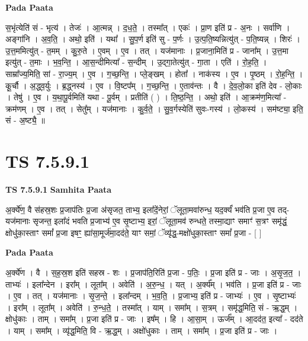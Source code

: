 \documentclass[17pt]{extarticle}
\begin{document}
\textbf{Pada Paata} \newline

स॒भृंत्येति॑ सं - भृत्य॑ । तेजः॑ । आ॒त्मन्न् । द॒ध॒ते॒ । तस्मा᳚त् । एकः॑ । प्रा॒ण इति॑ प्र - अ॒नः । सर्वा॑णि । अङ्गा॑नि । अ॒व॒ति॒ । अथो॒ इति॑ । यथा᳚ । सु॒प॒र्ण इति॑ सु - प॒र्णः । उ॒त्प॒ति॒ष्यन्नित्यु॑त् - प॒ति॒ष्यन्न् । शिरः॑ । उ॒त्त॒ममित्यु॑त् - त॒मम् । कु॒रु॒ते । ए॒वम् । ए॒व । तत् । यज॑मानाः । प्र॒जाना॒मिति॑ प्र - जाना᳚म् । उ॒त्त॒मा इत्यु॑त् - त॒माः । भ॒व॒न्ति॒ । आ॒स॒न्दीमित्या᳚ - स॒न्दीम् । उ॒द्गा॒तेत्यु॑त् - गा॒ता । एति॑ । रो॒ह॒ति॒ । साम्रा᳚ज्य॒मिति॒ सां - रा॒ज्य॒म् । ए॒व । ग॒च्छ॒न्ति॒ । प्ले॒ङ्खम् । होता᳚ । नाक॑स्य । ए॒व । पृ॒ष्ठम् । रो॒ह॒न्ति॒ । कू॒र्चौ । अ॒द्ध्व॒र्युः । ब्र॒द्ध्नस्य॑ । ए॒व । वि॒ष्टप᳚म् । ग॒च्छ॒न्ति॒ । ए॒ताव॑न्तः । वै । दे॒व॒लो॒का इति॑ देव - लो॒काः । तेषु॑ । ए॒व । य॒था॒पू॒र्वमिति॑ यथा - पू॒र्वम् । प्रतीति॑ ( ) । ति॒ष्ठ॒न्ति॒ । अथो॒ इति॑ । आ॒क्रम॑ण॒मित्या᳚ - क्रम॑णम् । ए॒व । तत् । सेतु᳚म् । यज॑मानाः । कु॒र्व॒ते॒ । सु॒व॒र्गस्येति॑ सुवः-गस्य॑ । लो॒कस्य॑ । सम॑ष्ट्या॒ इति॒ सं - अ॒ष्ट्यै॒ ॥  \newline





\section{ TS 7.5.9.1 }

\textbf{TS 7.5.9.1 } \newline
\textbf{Samhita Paata} \newline

अ॒र्क्ये॑ण॒ वै स॑हस्र॒शः प्र॒जाप॑तिः प्र॒जा अ॑सृजत॒ ताभ्य॒ इला᳚दें॒नेरां॒ ॅलूता॒मवा॑रुन्ध॒ यद॒र्क्यं॑ भव॑ति प्र॒जा ए॒व तद्-यज॑मानाः सृजन्त॒ इला᳚दं भवति प्र॒जाभ्य॑ ए॒व सृ॒ष्टाभ्य॒ इरां॒ ॅलूता॒मव॑ रुन्धते॒ तस्मा॒द्याꣳ समाꣳ॑ स॒त्रꣳ समृ॑द्धं॒ क्षोधु॑का॒स्ताꣳ समां᳚ प्र॒जा इषꣳ॒॒ ह्या॑सा॒मूर्ज॑मा॒दद॑ते॒ याꣳ समां॒ ॅव्यृ॑द्ध॒-मक्षो॑धुका॒स्ताꣳ समां᳚ प्र॒जा - [  ] \newline

\textbf{Pada Paata} \newline

अ॒र्क्ये॑ण । वै । स॒ह॒स्र॒श इति॑ सहस्र - शः । प्र॒जाप॑ति॒रिति॑ प्र॒जा - प॒तिः॒ । प्र॒जा इति॑ प्र - जाः । अ॒सृ॒ज॒त॒ । ताभ्यः॑ । इला᳚न्देन । इरा᳚म् । लूता᳚म् । अवेति॑ । अ॒रु॒न्ध॒ । यत् । अ॒र्क्य᳚म् । भव॑ति । प्र॒जा इति॑ प्र - जाः । ए॒व । तत् । यज॑मानाः । सृ॒ज॒न्ते॒ । इला᳚न्दम् । भ॒व॒ति॒ । प्र॒जाभ्य॒ इति॑ प्र - जाभ्यः॑ । ए॒व । सृ॒ष्टाभ्यः॑ । इरा᳚म् । लूता᳚म् । अवेति॑ । रु॒न्ध॒ते॒ । तस्मा᳚त् । याम् । समा᳚म् । स॒त्रम् । समृ॑द्ध॒मिति॒ सं - ऋ॒द्ध॒म् । क्षोधु॑काः । ताम् । समा᳚म् । प्र॒जा इति॑ प्र - जाः । इष᳚म् । हि । आ॒सा॒म् । ऊर्ज᳚म् । आ॒दद॑त॒ इत्या᳚ - दद॑ते । याम् । समा᳚म् । व्यृ॑द्ध॒मिति॒ वि - ऋ॒द्ध॒म् । अक्षो॑धुकाः । ताम् । समा᳚म् । प्र॒जा इति॑ प्र - जाः ।  \newline
\end{document}
